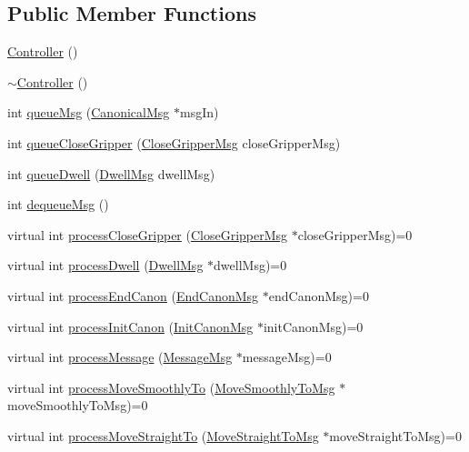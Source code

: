 \subsection*{Public Member Functions}
\begin{DoxyCompactItemize}
\item 
\hyperlink{class_controller_a95c56822d667e94b031451729ce069a9}{Controller} ()
\item 
\hyperlink{class_controller_a0ab87934c4f7a266cfdb86e0f36bc1b5}{$\sim$Controller} ()
\item 
int \hyperlink{class_controller_a45d996d1abb23d8e84edb35d04c5870f}{queueMsg} (\hyperlink{class_canonical_msg}{CanonicalMsg} $\ast$msgIn)
\item 
int \hyperlink{class_controller_a6b15d05b97d71db389603e91f0b344d0}{queueCloseGripper} (\hyperlink{class_close_gripper_msg}{CloseGripperMsg} closeGripperMsg)
\item 
int \hyperlink{class_controller_ad8bf10b2328e182033cd04ac6e0d8c9a}{queueDwell} (\hyperlink{class_dwell_msg}{DwellMsg} dwellMsg)
\item 
int \hyperlink{class_controller_a365bdbaf661a5c4328240f8f8838400d}{dequeueMsg} ()
\item 
virtual int \hyperlink{class_controller_a5ec3a5ed8ac04038cd0a2afe19e9e797}{processCloseGripper} (\hyperlink{class_close_gripper_msg}{CloseGripperMsg} $\ast$closeGripperMsg)=0
\item 
virtual int \hyperlink{class_controller_ae692153a067c9893d00ab3a13392c653}{processDwell} (\hyperlink{class_dwell_msg}{DwellMsg} $\ast$dwellMsg)=0
\item 
virtual int \hyperlink{class_controller_a06f7f8733ae96e812cb17b03faffe893}{processEndCanon} (\hyperlink{class_end_canon_msg}{EndCanonMsg} $\ast$endCanonMsg)=0
\item 
virtual int \hyperlink{class_controller_ad38c7457a8d09653baadff8d70df03b8}{processInitCanon} (\hyperlink{class_init_canon_msg}{InitCanonMsg} $\ast$initCanonMsg)=0
\item 
virtual int \hyperlink{class_controller_a93ff1647ac9341d8852f4017f98a6722}{processMessage} (\hyperlink{class_message_msg}{MessageMsg} $\ast$messageMsg)=0
\item 
virtual int \hyperlink{class_controller_a835d9f06bbdb8d23fa5969a3007c5dbc}{processMoveSmoothlyTo} (\hyperlink{class_move_smoothly_to_msg}{MoveSmoothlyToMsg} $\ast$moveSmoothlyToMsg)=0
\item 
virtual int \hyperlink{class_controller_a95e1b3c824aff33ffa6775b1eca4b4ee}{processMoveStraightTo} (\hyperlink{class_move_straight_to_msg}{MoveStraightToMsg} $\ast$moveStraightToMsg)=0

\end{DoxyCompactItemize}
